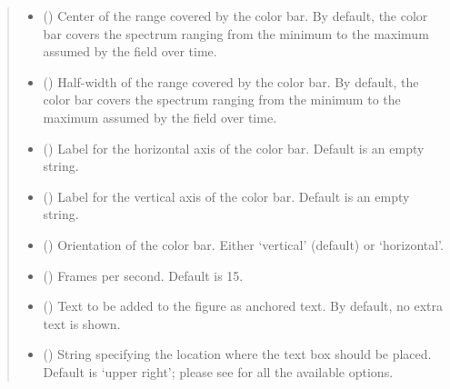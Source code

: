 \documentclass[letterpaper,10pt,english]{sphinxmanual}
\begin{document}
\begin{fulllineitems}
\begin{quote}
\begin{description}
\begin{itemize}
\item {} 
 () \textendash{} Center of the range covered by the color bar. By default, the color bar covers the spectrum
ranging from the minimum to the maximum assumed by the field over time.

\item {} 
 () \textendash{} Half-width of the range covered by the color bar. By default, the color bar covers the spectrum
ranging from the minimum to the maximum assumed by the field over time.

\item {} 
 () \textendash{} Label for the horizontal axis of the color bar. Default is an empty string.

\item {} 
 () \textendash{} Label for the vertical axis of the color bar. Default is an empty string.

\item {} 
 () \textendash{} Orientation of the color bar. Either ‘vertical’ (default) or ‘horizontal’.

\item {} 
 () \textendash{} Frames per second. Default is 15.

\item {} 
 () \textendash{} Text to be added to the figure as anchored text. By default, no extra text is shown.

\item {} 
 () \textendash{} String specifying the location where the text box should be placed. Default is ‘upper right’;
please see  for all the available options.

\end{itemize}

\end{description}\end{quote}

\end{fulllineitems}
\end{document}
